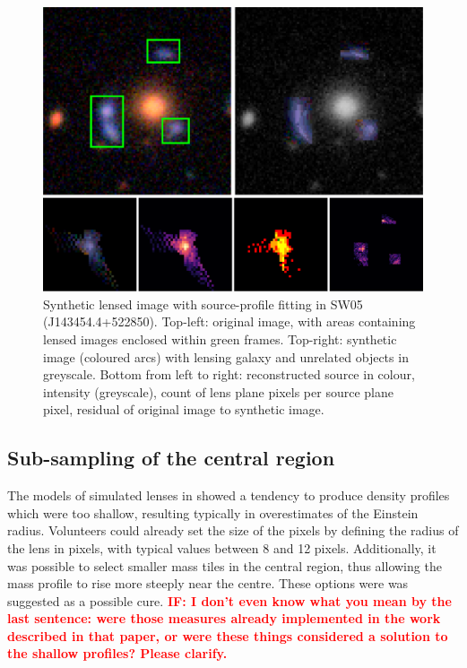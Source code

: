 \begin{figure}
  \includegraphics[width=\linewidth]{img/new_synth_img_detailed}
  \caption{Synthetic lensed image with source-profile fitting in SW05
    (J143454.4+522850). Top-left: original image, with areas
    containing lensed images enclosed within green frames.  Top-right:
    synthetic image (coloured arcs) with lensing galaxy and unrelated
    objects in greyscale.  Bottom from left to right: reconstructed
    source in colour, intensity (greyscale), count of lens plane
    pixels per source plane pixel, residual of original image to
    synthetic image.}
  \label{fig:synthimg}
\end{figure}

\subsection{Sub-sampling of the central region}\label{subsec:hires}

The models of simulated lenses in \cite{2015MNRAS.447.2170K} showed a
tendency to produce density profiles which were too shallow, resulting
typically in overestimates of the Einstein radius. Volunteers could
already set the size of the pixels by defining the radius of the lens
in pixels, with typical values between 8 and 12 pixels. Additionally,
it was possible to select smaller mass tiles in the central region,
thus allowing the mass profile to rise more steeply near the centre.
These options were was suggested as a possible cure.
\textcolor{red}{\bf IF: I don't even know what you mean by the last
  sentence: were those measures already implemented in the work
  described in that paper, or were these things considered a solution
  to the shallow profiles? Please clarify.}


